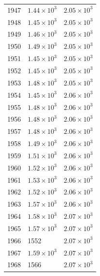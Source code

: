 \begin{table}[H]
\begin{tabular}{lll}
1947 & $\displaystyle 1.44 \times 10^{3}$ & $\displaystyle 2.05 \times 10^{3}$ \\
1948 & $\displaystyle 1.45 \times 10^{3}$ & $\displaystyle 2.05 \times 10^{3}$ \\
1949 & $\displaystyle 1.46 \times 10^{3}$ & $\displaystyle 2.05 \times 10^{3}$ \\
1950 & $\displaystyle 1.49 \times 10^{3}$ & $\displaystyle 2.05 \times 10^{3}$ \\
1951 & $\displaystyle 1.45 \times 10^{3}$ & $\displaystyle 2.05 \times 10^{3}$ \\
1952 & $\displaystyle 1.45 \times 10^{3}$ & $\displaystyle 2.05 \times 10^{3}$ \\
1953 & $\displaystyle 1.48 \times 10^{3}$ & $\displaystyle 2.05 \times 10^{3}$ \\
1954 & $\displaystyle 1.45 \times 10^{3}$ & $\displaystyle 2.06 \times 10^{3}$ \\
1955 & $\displaystyle 1.48 \times 10^{3}$ & $\displaystyle 2.06 \times 10^{3}$ \\
1956 & $\displaystyle 1.48 \times 10^{3}$ & $\displaystyle 2.06 \times 10^{3}$ \\
1957 & $\displaystyle 1.48 \times 10^{3}$ & $\displaystyle 2.06 \times 10^{3}$ \\
1958 & $\displaystyle 1.49 \times 10^{3}$ & $\displaystyle 2.06 \times 10^{3}$ \\
1959 & $\displaystyle 1.51 \times 10^{3}$ & $\displaystyle 2.06 \times 10^{3}$ \\
1960 & $\displaystyle 1.52 \times 10^{3}$ & $\displaystyle 2.06 \times 10^{3}$ \\
1961 & $\displaystyle 1.53 \times 10^{3}$ & $\displaystyle 2.06 \times 10^{3}$ \\
1962 & $\displaystyle 1.52 \times 10^{3}$ & $\displaystyle 2.06 \times 10^{3}$ \\
1963 & $\displaystyle 1.57 \times 10^{3}$ & $\displaystyle 2.06 \times 10^{3}$ \\
1964 & $\displaystyle 1.58 \times 10^{3}$ & $\displaystyle 2.07 \times 10^{3}$ \\
1965 & $\displaystyle 1.57 \times 10^{3}$ & $\displaystyle 2.07 \times 10^{3}$ \\
1966 & 1552 & $\displaystyle 2.07 \times 10^{3}$ \\
1967 & $\displaystyle 1.59 \times 10^{3}$ & $\displaystyle 2.07 \times 10^{3}$ \\
1968 & 1566 & $\displaystyle 2.07 \times 10^{3}$ \\

\end{tabular}
\end{table}
